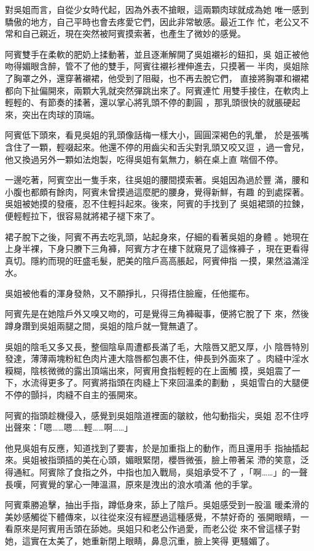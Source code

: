 對吳姐而言，自從少女時代起，因為外表不搶眼，這兩顆肉球就成為她
唯一感到驕傲的地方，自己平時也會去疼愛它們，因此非常敏感。最近工作
忙，老公又不常和自己親近，現在突然被阿賓摸索著，也產生了微妙的感覺。

阿賓雙手在柔軟的肥奶上揉動著，並且逐漸解開了吳姐襯衫的鈕扣，吳
姐正被他吻得媚眼含醉，管不了他的雙手，阿賓往襯衫裡伸進去，只摸著一
半肉，吳姐除了胸罩之外，還穿著襯裙，他受到了阻礙，也不再去脫它們，
直接將胸罩和襯裙都向下扯偏開來，兩顆大乳就突然彈跳出來了。阿賓連忙
用雙手接住，在軟肉上輕輕的、有節奏的揉著，還以掌心將乳頭不停的劃圓
，那乳頭很快的就脹硬起來，突出在肉球的頂端。

阿賓低下頭來，看見吳姐的乳頭像話梅一樣大小，圓圓深褐色的乳暈，
於是張嘴含住了一顆，輕啜起來。他還不停的用齒尖和舌尖對乳頭又咬又逗
，過一會兒，他又換過另外一顆如法炮製，吃得吳姐有氣無力，躺在桌上直
喘個不停。

一邊吃著，阿賓空出一隻手來，往吳姐的腰間摸索著。吳姐因為過於豐
滿，腰和小腹也都頗有餘肉，阿賓未曾摸過這麼肥的腰身，覺得新鮮，有趣
的到處探著。吳姐被她摸的發癢，忍不住輕抖起來。後來，阿賓的手找到了
吳姐裙頭的拉鍊，便輕輕拉下，很容易就將裙子褪下來了。

裙子脫下之後，阿賓不再去吃乳頭，站起身來，仔細的看著吳姐的身體
。她現在上身半裸，下身只賸下三角褲，阿賓方才在樓下就窺見了這條褲子
，現在更看得真切。隱約而現的旺盛毛髮，肥美的陰戶高高脹起，阿賓伸指
一摸，果然溢滿淫水。

吳姐被他看的渾身發熱，又不願掙扎，只得捂住臉龐，任他擺布。

阿賓先是在她陰戶外又嗅又吻的，可是覺得三角褲礙事，便將它脫了下
來，然後蹲身躦到吳姐兩腿之間，吳姐的陰戶就一覽無遺了。

吳姐的陰毛又多又長，整個陰阜周遭都長滿了毛，大陰唇又肥又厚，小
陰唇特別發達，薄薄兩塊粉紅色肉片連大陰唇都包裹不住，伸長到外面來了
。肉縫中淫水糢糊，陰核微微的露出頂端出來，阿賓用食指輕輕的在上面觸
摸，吳姐震了一下，水流得更多了。阿賓將指頭在肉縫上下來回溫柔的劃動
，吳姐雪白的大腿便不停的顫抖，肉縫不自主的張開來。

阿賓的指頭趁機侵入，感覺到吳姐陰道裡面的皺紋，他勾動指尖，吳姐
忍不住哼出聲來：「嗯……嗯……輕……啊……」

他見吳姐有反應，知道找到了要害，於是加重指上的動作，而且還用手
指抽插起來。吳姐被指頭插的美在心頭，媚眼緊閉，櫻唇微張，臉上帶著呆
滯的笑意，泛得通紅。阿賓除了食指之外，中指也加入戰局，吳姐承受不了
，「啊……」的一聲長嘆，阿賓覺的掌心一陣溫濕，原來是洩出的浪水噴滿
他的手掌。

阿賓乘勝追擊，抽出手指，蹲低身來，舔上了陰戶。吳姐感受到一股溫
暖柔滑的美妙感觸從下體傳來，以往從來沒有經歷過這種感覺，不禁好奇的
張開眼睛，一看原來是阿賓用舌頭在舔她。吳姐只和老公作過愛，而老公從
來不曾這樣子對她，這實在太美了，她重新閉上眼睛，鼻息沉重，臉上笑得
更騷媚了。

